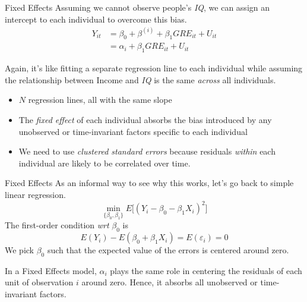 \documentclass{clbeamer2024}
\begin{document}
\begin{frame}{Fixed Effects}
    Assuming we cannot observe people's \textit{IQ}, we can assign an intercept to each individual to overcome this bias.
    \begin{equation*}
        \begin{split}
            Y_{it} & = \beta_0 + \beta^{(i)} + \beta_1 GRE_{it} + U_{it} \\
                & = \alpha_i + \beta_1 \textit{GRE}_{it} + U_{it}
        \end{split}
    \end{equation*}

    Again, it's like fitting a separate regression line to each individual while assuming the relationship between Income and \textit{IQ} is the same \textit{across} all individuals.
    \begin{itemize}
        \item $N$ regression lines, all with the same slope
        \item The \textit{fixed effect} of each individual absorbs the bias introduced by any unobserved or time-invariant factors specific to each individual
        \item We need to use \textit{clustered standard errors} because residuals \textit{within} each individual are likely to be correlated over time.
    \end{itemize}
\end{frame}

\begin{frame}{Fixed Effects}
    As an informal way to see why this works, let's go back to simple linear regression.
    \begin{equation*}
        \min_{\{\beta_0, \beta_1\}} E\Big[(Y_i - \beta_0 - \beta_1 X_i )^2 \Big]
    \end{equation*}
    The first-order condition \textit{wrt} $\beta_0$ is
    \begin{equation*}
        E(Y_i) - E(\beta_0 + \beta_1 X_i) = E(\varepsilon_i) = 0
    \end{equation*}
    We pick $\beta_0$ such that the expected value of the errors is centered around zero.

    In a Fixed Effects model, $\alpha_i$ plays the same role in centering the residuals of each unit of observation $i$ around zero. Hence, it absorbs all unobserved or time-invariant factors.
\end{frame}
\end{document}
